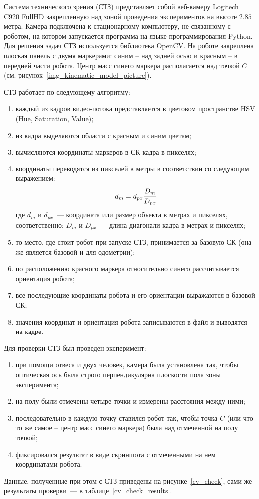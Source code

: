 \label{app_cv_system}

Система технического зрения (СТЗ) представляет собой веб-камеру Logitech C920 FullHD закрепленную над зоной проведения экспериментов на высоте $2.85$ метра. Камера подключена к стационарному компьютеру, не связанному с роботом, на котором запускается программа на языке программирования Python. Для решения задач СТЗ используется библиотека OpenCV. На роботе закреплена плоская панель с двумя маркерами: синим -- над задней осью и красным -- в передней части робота. Центр масс синего маркера располагается над точкой $C$ (см. рисунок~\ref{img_kinematic_model_picture}).

СТЗ работает по следующему алгоритму:
\begin{enumerate}
	\item каждый из кадров видео-потока представляется в цветовом пространстве HSV (Hue, Saturation, Value);
	\item из кадра выделяются области с красным и синим цветам;
	\item вычисляются координаты маркеров в СК кадра в пикселях;
	\item координаты переводятся из пикселей в метры в соответствии со следующим выражением:
	\begin{equation}
		d_{m} = d_{px} \cfrac{D_{m}}{D_{px}}
	\end{equation}
	где $d_{m}$ и $d_{px}$~--- координата или размер объекта в метрах и пикселях, соответственно; $D_{m}$ и $D_{px}$~--- длина диагонали кадра в метрах и пикселях;
	\item то место, где стоит робот при запуске СТЗ, принимается за базовую СК (она же является базовой и для одометрии);
	\item по расположению красного маркера относительно синего рассчитывается ориентация робота;
	\item все последующие координаты робота и его ориентации выражаются в базовой СК;
	\item значения координат и ориентация робота записываются в файл и выводятся на кадре.  
\end{enumerate}

Для проверки СТЗ был проведен эксперимент:
\begin{enumerate}
	\item при помощи отвеса и двух человек, камера была установлена так, чтобы оптическая ось была строго перпендикулярна плоскости пола зоны эксперимента;
	\item на полу были отмечены четыре точки и измерены расстояния между ними;
	\item последовательно в каждую точку ставился робот так, чтобы точка $C$ (или что то же самое -- центр масс синего маркера) была над отмеченной на полу точкой;
	\item фиксировался результат в виде скриншота с отмеченными на нем координатами робота. 
\end{enumerate}
Данные, полученные при этом с СТЗ приведены на рисунке~\ref{cv_check}, сами же результаты проверки~--- в таблице~\ref{cv_check_results}.


